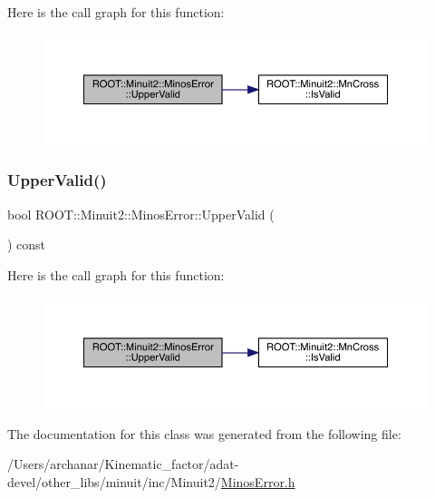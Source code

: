 Here is the call graph for this function\+:
\nopagebreak
\begin{figure}[H]
\begin{center}
\leavevmode
\includegraphics[width=350pt]{d2/dd1/classROOT_1_1Minuit2_1_1MinosError_a4180ae7ff87d9a2c0942c8e6ac81a8c0_cgraph}
\end{center}
\end{figure}
\mbox{\label{classROOT_1_1Minuit2_1_1MinosError_a4180ae7ff87d9a2c0942c8e6ac81a8c0}} 
\subsubsection{\texorpdfstring{UpperValid()}{UpperValid()}\hspace{0.1cm}{\footnotesize\ttfamily [3/3]}}
{\footnotesize\ttfamily bool R\+O\+O\+T\+::\+Minuit2\+::\+Minos\+Error\+::\+Upper\+Valid (\begin{DoxyParamCaption}{ }\end{DoxyParamCaption}) const\hspace{0.3cm}{\ttfamily [inline]}}

Here is the call graph for this function\+:
\nopagebreak
\begin{figure}[H]
\begin{center}
\leavevmode
\includegraphics[width=350pt]{d2/dd1/classROOT_1_1Minuit2_1_1MinosError_a4180ae7ff87d9a2c0942c8e6ac81a8c0_cgraph}
\end{center}
\end{figure}


The documentation for this class was generated from the following file\+:\begin{DoxyCompactItemize}
\item 
/\+Users/archanar/\+Kinematic\+\_\+factor/adat-\/devel/other\+\_\+libs/minuit/inc/\+Minuit2/\mbox{\hyperlink{adat-devel_2other__libs_2minuit_2inc_2Minuit2_2MinosError_8h}{Minos\+Error.\+h}}\end{DoxyCompactItemize}
